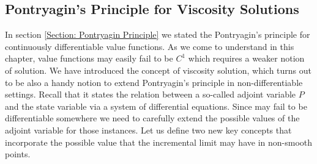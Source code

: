 





    


\subsection{Pontryagin's Principle for Viscosity Solutions}

In section \ref{Section: Pontryagin Principle} we stated the Pontryagin's principle for continuously differentiable value functions. 
As we come to understand in this chapter, value functions may easily fail to be $C^1$ which requires a weaker notion of solution. We have introduced 
the concept of viscosity solution, which turns out to be also a handy notion to extend Pontryagin's principle in non-differentiable settings. 
Recall that it states the relation between a so-called adjoint variable $P$ and the state variable via a system of differential equations. Since may fail 
to be differentiable somewhere we need to carefully extend the possible values of the adjoint variable for those instances. Let us 
define two new key concepts that incorporate the possible value that the incremental limit may have in non-smooth points. 

